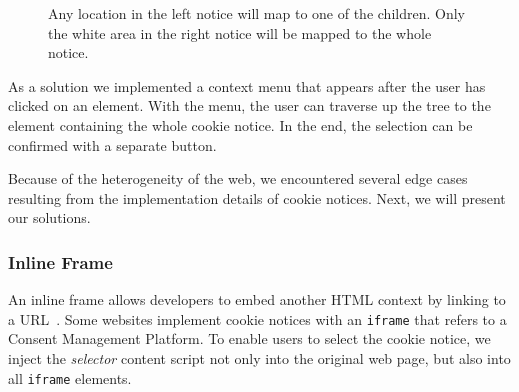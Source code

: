 \begin{figure}
	\centering
	\begin{minipage}{0.48\textwidth}
		\centering
	\end{minipage}\hfill
	\begin{minipage}{0.48\textwidth}
		\centering
	\end{minipage}
	\caption{Any location in the left notice will map to one of the children. Only the white area in the right notice will be mapped to the whole notice.}
	\label{fig:notice-fillout}
\end{figure}

As a solution we implemented a context menu that appears after the user has clicked on an element.
With the menu, the user can traverse up the tree to the element containing the whole cookie notice.
In the end, the selection can be confirmed with a separate button.

Because of the heterogeneity of the web, we encountered several edge cases resulting from the implementation details of cookie notices. 
Next, we will present our solutions.

\subsubsection{Inline Frame}
An inline frame allows developers to embed another HTML context by linking to a URL~\cite{iframeMdn}.
Some websites implement cookie notices with an \verb|iframe| that refers to a Consent Management Platform.
To enable users to select the cookie notice, we inject the \emph{selector} content script not only into the original web page, but also into all \verb|iframe| elements.

